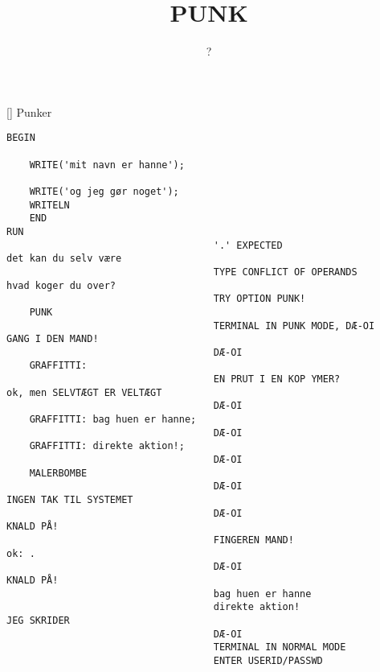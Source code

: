 \documentclass[a4paper,11pt]{article}
\title{PUNK}
\author{?}
\begin{document}
\maketitle

\begin{roles}
[] Punker
\end{roles}

\begin{sketch}

\begin{verbatim}
BEGIN

    WRITE('mit navn er hanne');

    WRITE('og jeg gør noget');
    WRITELN
    END
RUN
                                    '.' EXPECTED
det kan du selv være
                                    TYPE CONFLICT OF OPERANDS
hvad koger du over?
                                    TRY OPTION PUNK!
    PUNK
                                    TERMINAL IN PUNK MODE, DÆ-OI
GANG I DEN MAND!
                                    DÆ-OI
    GRAFFITTI:
                                    EN PRUT I EN KOP YMER?
ok, men SELVTÆGT ER VELTÆGT
                                    DÆ-OI
    GRAFFITTI: bag huen er hanne;
                                    DÆ-OI
    GRAFFITTI: direkte aktion!;
                                    DÆ-OI
    MALERBOMBE
                                    DÆ-OI
INGEN TAK TIL SYSTEMET
                                    DÆ-OI
KNALD PÅ!
                                    FINGEREN MAND!
ok: .
                                    DÆ-OI
KNALD PÅ!
                                    bag huen er hanne
                                    direkte aktion!
JEG SKRIDER
                                    DÆ-OI
                                    TERMINAL IN NORMAL MODE
                                    ENTER USERID/PASSWD
\end{verbatim}


\end{sketch}
\end{document}
